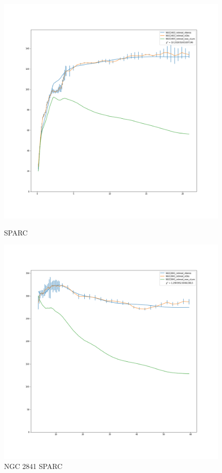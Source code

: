 \documentclass[reprint,%
 amsmath,amssymb,
 aps,
]{revtex4-1}
\begin{document}
  
\begin{figure} 
\centering
\begin{minipage}{0.5\textwidth}
  \includegraphics[width=.8\linewidth]{figures/NGC2403_rotmod_XueSofue.png}
\caption{ SPARC\cite{2016Lelli}}
\label{fig:2403}
\end{minipage}
\begin{minipage}{0.5\textwidth}
\includegraphics[width=0.8\linewidth]{figures/NGC2841_rotmod_XueSofue.png}
\caption{NGC 2841 SPARC\cite{2016Lelli}}
\label{fig:2841}
\end{minipage}
\end{figure}
 
\end{document}
